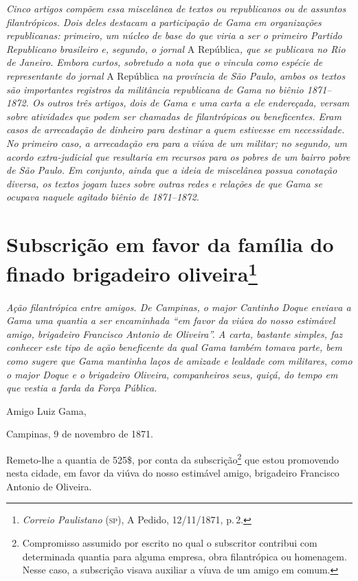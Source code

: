\begin{argumento}
\emph{Cinco artigos compõem essa miscelânea de textos ou republicanos ou
de assuntos filantrópicos. Dois deles destacam a participação de Gama em
organizações republicanas: primeiro, um núcleo de base do que viria a
ser o primeiro Partido Republicano brasileiro e, segundo, o jornal} A
República\emph{, que se publicava no Rio de Janeiro. Embora curtos,
sobretudo a nota que o vincula como espécie de representante do jornal}
A República \emph{na província de São Paulo, ambos os textos são
importantes registros da militância republicana de Gama no biênio
1871--1872. Os outros três artigos, dois de Gama e uma carta a ele
endereçada, versam sobre atividades que podem ser chamadas de
filantrópicas ou beneficentes. Eram casos de arrecadação de dinheiro
para destinar a quem estivesse em necessidade. No primeiro caso, a
arrecadação era para a viúva de um militar; no segundo, um acordo
extra-judicial que resultaria em recursos para os pobres de um bairro
pobre de São Paulo. Em conjunto, ainda que a ideia de miscelânea possua
conotação diversa, os textos jogam luzes sobre outras redes e relações
de que Gama se ocupava naquele agitado biênio de 1871--1872.}
\end{argumento}

\chapter{Subscrição em favor da família do finado brigadeiro oliveira\footnote{\emph{Correio Paulistano} (\textsc{sp}), A Pedido, 12/11/1871,
  p.\,2.}} %

\begin{didascalia}
\emph{Ação filantrópica entre amigos. De Campinas, o major Cantinho
Doque enviava a Gama uma quantia a ser encaminhada ``em favor da viúva do
nosso estimável amigo, brigadeiro Francisco Antonio de Oliveira''. A
carta, bastante simples, faz conhecer este tipo de ação beneficente da
qual Gama também tomava parte, bem como sugere que Gama mantinha laços
de amizade e lealdade com militares, como o major Doque e o brigadeiro
Oliveira, companheiros seus, quiçá, do tempo em que vestia a farda da
Força Pública.}
\end{didascalia}


Amigo Luiz Gama,

Campinas, 9 de novembro de 1871.

Remeto-lhe a quantia de 525\$, por conta da subscrição\footnote{
  Compromisso assumido por escrito no qual o subscritor contribui com
  determinada quantia para alguma empresa, obra filantrópica ou
  homenagem. Nesse caso, a subscrição visava auxiliar a víuva de um
  amigo em comum.} que estou promovendo nesta cidade, em favor da viúva
do nosso estimável amigo, brigadeiro Francisco Antonio de Oliveira.

